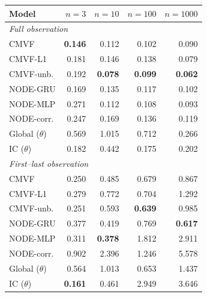 \begin{tabular}{lrrrr}
\toprule
Model & $n{=}3$ & $n{=}10$ & $n{=}100$ & $n{=}1000$ \\
\midrule
\multicolumn{5}{l}{\emph{Full observation}} \\
CMVF & \textbf{0.146} & 0.112 & 0.102 & 0.090 \\
CMVF-L1 & 0.181 & 0.146 & 0.138 & 0.079 \\
CMVF-unb. & 0.192 & \textbf{0.078} & \textbf{0.099} & \textbf{0.062} \\
NODE-GRU & 0.169 & 0.135 & 0.117 & 0.102 \\
NODE-MLP & 0.271 & 0.112 & 0.108 & 0.093 \\
NODE-corr. & 0.247 & 0.169 & 0.136 & 0.119 \\
Global ($\theta$) & 0.569 & 1.015 & 0.712 & 0.266 \\
IC ($\theta$) & 0.182 & 0.442 & 0.175 & 0.202 \\
\midrule
\multicolumn{5}{l}{\emph{First--last observation}} \\
CMVF & 0.250 & 0.485 & 0.679 & 0.867 \\
CMVF-L1 & 0.279 & 0.772 & 0.704 & 1.292 \\
CMVF-unb. & 0.251 & 0.593 & \textbf{0.639} & 0.985 \\
NODE-GRU & 0.377 & 0.419 & 0.769 & \textbf{0.617} \\
NODE-MLP & 0.311 & \textbf{0.378} & 1.812 & 2.911 \\
NODE-corr. & 0.902 & 2.396 & 1.246 & 5.578 \\
Global ($\theta$) & 0.564 & 1.013 & 0.653 & 1.437 \\
IC ($\theta$) & \textbf{0.161} & 0.461 & 2.949 & 3.646 \\
\bottomrule
\end{tabular}
